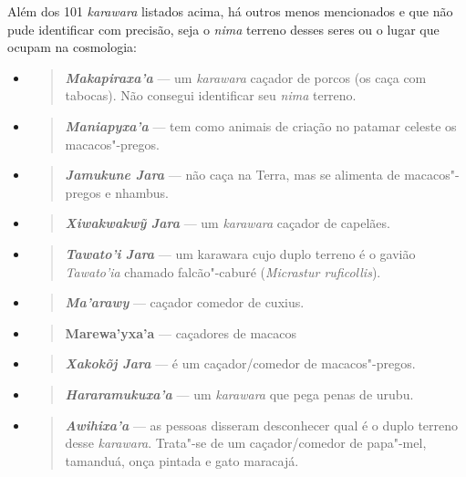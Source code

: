Além dos 101 \emph{karawara} listados acima, há outros menos mencionados
e que não pude identificar com precisão, seja o \emph{nima} terreno
desses seres ou o lugar que ocupam na cosmologia:

\begin{itemize}
\item
  \begin{quote}
  \emph{\textbf{Makapiraxa'a}} --- um \emph{karawara} caçador de porcos
  (os caça com tabocas). Não consegui identificar seu \emph{nima}
  terreno.
  \end{quote}
\item
  \begin{quote}
  \emph{\textbf{Maniapyxa'a}} --- tem como animais de criação no patamar
  celeste os macacos"-pregos.
  \end{quote}
\item
  \begin{quote}
  \emph{\textbf{Jamukune Jara}} --- não caça na Terra, mas se alimenta de
  macacos"-pregos e nhambus.
  \end{quote}
\item
  \begin{quote}
  \textbf{\emph{Xiwakwakwỹ} \emph{Jara}} --- um \emph{karawara} caçador de
  capelães.
  \end{quote}
\item
  \begin{quote}
  \textbf{\emph{Tawato'i} \emph{Jara}} --- um karawara cujo duplo terreno
  é o gavião \emph{Tawato'ia} chamado falcão"-caburé (\emph{Micrastur
  ruficollis}).
  \end{quote}
\item
  \begin{quote}
  \emph{\textbf{Ma'arawy}} --- caçador comedor de cuxius.
  \end{quote}
\item
  \begin{quote}
  \textbf{Marewa'yxa'a} --- caçadores de macacos 
  \end{quote}
\item
  \begin{quote}
  \textbf{\emph{Xakokõj Jara}} --- é um caçador/comedor de
  macacos"-pregos.
  \end{quote}
\item
  \begin{quote}
  \emph{\textbf{Hararamukuxa'a}} --- um \emph{karawara} que pega penas de
  urubu.
  \end{quote}
\item
  \begin{quote}
  \emph{\textbf{Awihixa'a}} --- as pessoas disseram desconhecer qual é o
  duplo terreno desse \emph{karawara}. Trata"-se de um caçador/comedor de
  papa"-mel, tamanduá, onça pintada e gato maracajá.
  \end{quote}
\end{itemize}


